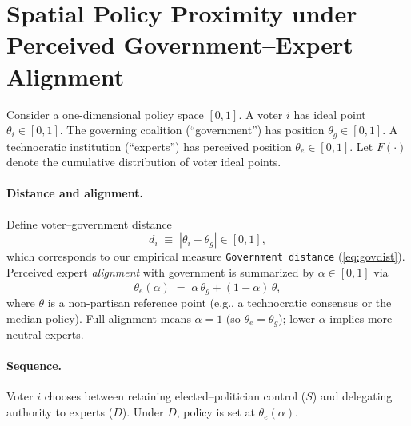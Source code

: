 \documentclass[11pt]{article}\usepackage[]{graphicx}\usepackage[]{xcolor}
\begin{document}






\section{Spatial Policy Proximity under Perceived Government--Expert Alignment}

Consider a one-dimensional policy space $[0,1]$. A voter $i$ has ideal point $\theta_i \in [0,1]$. The governing coalition (``government'') has position $\theta_g \in [0,1]$. A technocratic institution (``experts'') has perceived position $\theta_e \in [0,1]$. Let $F(\cdot)$ denote the cumulative distribution of voter ideal points.

\paragraph{Distance and alignment.}

Define voter--government distance
\[
d_i \;\equiv\; |\theta_i - \theta_g| \in [0,1],
\]
which corresponds to our empirical measure \texttt{Government distance} (\autoref{eq:govdist}). Perceived expert \emph{alignment} with government is summarized by $\alpha \in [0,1]$ via
\[
\theta_e(\alpha) \;=\; \alpha\,\theta_g + (1-\alpha)\,\bar\theta,
\]
where $\bar\theta$ is a non-partisan reference point (e.g., a technocratic consensus or the median policy). Full alignment means $\alpha=1$ (so $\theta_e=\theta_g$); lower $\alpha$ implies more neutral experts.

\paragraph{Sequence.}

Voter $i$ chooses between retaining elected--politician control ($S$) and delegating authority to experts ($D$). Under $D$, policy is set at $\theta_e(\alpha)$.
\end{document}
